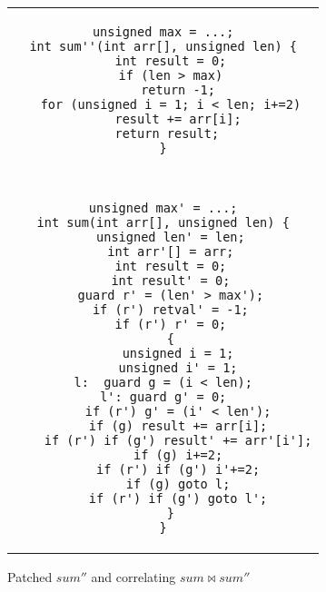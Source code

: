 \begin{figure}
\centering
\begin{tabular}{c}
\begin{lstlisting}
unsigned max = ...;
int sum''(int arr[], unsigned len) {
  int result = 0;
  if (len > max)
    return -1;
  for (unsigned i = 1; i < len; i+=2)
    result += arr[i];
 return result;
}
\end{lstlisting}
\\
\\ \hline
\\
\begin{lstlisting}
unsigned max' = ...;
int sum(int arr[], unsigned len) {
  unsigned len' = len;
  int arr'[] = arr;
  int result = 0;
  int result' = 0;
  guard r' = (len' > max');
  if (r') retval' = -1;
  if (r') r' = 0;
  {
    unsigned i = 1;
    unsigned i' = 1;
l:  guard g = (i < len);
l': guard g' = 0;
    if (r') g' = (i' < len');
    if (g) result += arr[i];
    if (r') if (g') result' += arr'[i'];
    if (g) i+=2;
    if (r') if (g') i'+=2;
    if (g) goto l;
    if (r') if (g') goto l';
  }
}
\end{lstlisting}
\end{tabular}
\caption{Patched $sum''$ and correlating $sum \bowtie sum''$}
\end{figure} 